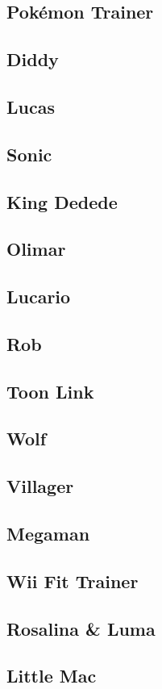 \begin{multicols}{2}
\subsection{Pok\'emon Trainer}
\subsection{Diddy}
\subsection{Lucas}
\subsection{Sonic}
\subsection{King Dedede}
\subsection{Olimar}
\subsection{Lucario}
\subsection{Rob}
\subsection{Toon Link}
\subsection{Wolf}
\subsection{Villager}
\subsection{Megaman}
\subsection{Wii Fit Trainer}
\subsection{Rosalina \& Luma}
\subsection{Little Mac}

\end{multicols}
